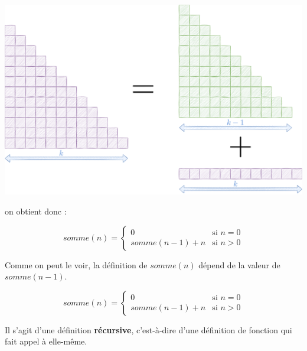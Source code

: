 \documentclass[a4paper,17pt]{extarticle}
\begin{document}
\begin{reponse}
\includegraphics{res/sommek.png}

on obtient donc :

\[
somme(n) = \left\{
    \begin{array}{ll}
        0 & \text{si }n=0 \\
        somme (n-1) + n & \text{si }n>0 
    \end{array}
\right.
\]

            \end{reponse}
    Comme on peut le voir, la définition de \(somme(n)\) dépend de la valeur
de \(somme(n-1)\).

\[
somme(n) = \left\{
    \begin{array}{ll}
        0 & \text{si }n=0 \\
        somme (n-1) + n & \text{si }n>0 
    \end{array}
\right.
\]

Il s'agit d'une définition \textbf{récursive}, c'est-à-dire d'une
définition de fonction qui fait appel à elle-même.
\end{document}
